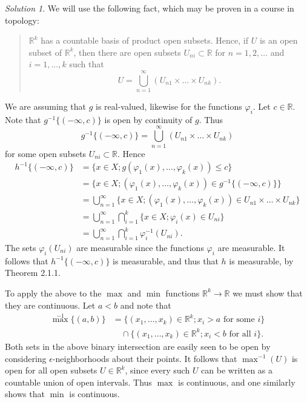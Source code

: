 \documentclass{report}
\newcommand{\bb}[1]{\mathbb{#1}}
\theoremstyle{remark}
\newtheorem*{solution}{Solution}
\begin{document}
\begin{solution}
  We will use the following fact, which may be proven in a course in topology:
  \begin{quote}
    $\bb R^k$ has a countable basis of product open subsets. Hence, if $U$ is an open subset of $\bb R^k$, then there are open subsets $U_{ni} \subset \bb R$ for $n = 1, 2, \dots$ and $i = 1, \dots, k$ such that
    \begin{equation*}
      U = \bigcup_{n=1}^\infty (U_{n1} \times \dots \times U_{nk}).
    \end{equation*}
  \end{quote}

  We are assuming that $g$ is real-valued, likewise for the functions $\varphi_i$. Let $c \in \bb R$. Note that $g^{-1}\{(-\infty,c)\}$ is open by continuity of $g$. Thus
  \begin{equation*}
    g^{-1}\{(-\infty,c)\} = \bigcup_{n=1}^\infty (U_{n1} \times \dots \times U_{nk})
  \end{equation*}
  for some open subsets $U_{ni} \subset \bb R$. Hence
  \begin{equation*}
    \begin{split}
      h^{-1}\{(-\infty,c)\} &= \{x \in X; g(\varphi_1(x), \dots, \varphi_k(x)) \le c\} \\
      &= \{x \in X; (\varphi_1(x), \dots, \varphi_k(x)) \in g^{-1}\{(-\infty,c)\}\} \\
      &= \bigcup_{n=1}^\infty \{x \in X; (\varphi_1(x), \dots, \varphi_k(x)) \in U_{n1} \times \dots \times U_{nk}\} \\
      &= \bigcup_{n=1}^\infty \bigcap_{i=1}^k \{x \in X; \varphi_i(x) \in U_{ni}\} \\
      &= \bigcup_{n=1}^\infty \bigcap_{i=1}^k \varphi_i^{-1}(U_{ni}).
    \end{split}
  \end{equation*}
  The sets $\varphi_i(U_{ni})$ are measurable since the functions $\varphi_i$ are measurable. It follows that $h^{-1}\{(-\infty,c)\}$ is measurable, and thus that $h$ is measurable, by Theorem 2.1.1.

  To apply the above to the $\max$ and $\min$ functions $\bb R^k \to \bb R$ we must show that they are continuous. Let $a < b$ and note that
  \begin{equation*}
    \begin{split}
      {\max}^{-1}\{(a,b)\} &= \{(x_1, \dots, x_k) \in \bb R^k; \text{$x_i > a$ for some $i$}\} \\
      &\quad \cap \{(x_1, \dots, x_k) \in \bb R^k; \text{$x_i < b$ for all $i$}\}.
    \end{split}
  \end{equation*}
  Both sets in the above binary intersection are easily seen to be open by considering $\epsilon$-neighborhoods about their points. It follows that $\max^{-1}(U)$ is open for all open subsets $U \in \bb R^k$, since every such $U$ can be written as a countable union of open intervals. Thus $\max$ is continuous, and one similarly shows that $\min$ is continuous.
\end{solution}
\end{document}
